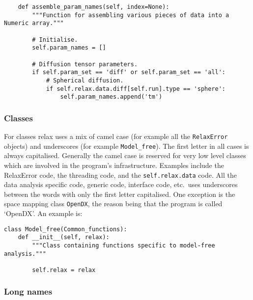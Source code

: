 \begin{footnotesize}
\begin{verbatim}
    def assemble_param_names(self, index=None):
        """Function for assembling various pieces of data into a Numeric array."""

        # Initialise.
        self.param_names = []

        # Diffusion tensor parameters.
        if self.param_set == 'diff' or self.param_set == 'all':
            # Spherical diffusion.
            if self.relax.data.diff[self.run].type == 'sphere':
                self.param_names.append('tm')
\end{verbatim}
\end{footnotesize}



\subsubsection{Classes}

For classes relax uses a mix of camel case (for example all the \texttt{RelaxError} objects) and underscores (for example \texttt{Model\_free}).  The first letter in all cases is always capitalised.  Generally the camel case is reserved for very low level classes which are involved in the program's infrastructure.  Examples include the RelaxError code, the threading code, and the \texttt{self.relax.data} code.  All the data analysis specific code, generic code, interface code, etc.\ uses underscores between the words with only the first letter capitalised.  One exception is the space mapping class \texttt{OpenDX}, the reason being that the program is called `OpenDX'.  An example is:

\begin{footnotesize}
\begin{verbatim}
class Model_free(Common_functions):
    def __init__(self, relax):
        """Class containing functions specific to model-free analysis."""

        self.relax = relax
\end{verbatim}
\end{footnotesize}



\subsubsection{Long names}

